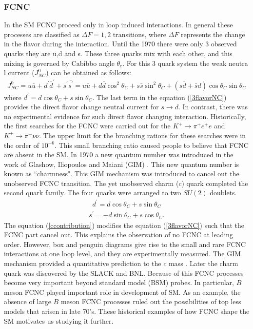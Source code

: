 \subsubsection{FCNC}
In the SM FCNC proceed only in loop induced interactions. In general these processes are classified as $\Delta F=1,2$ transitions, where $\Delta F$ represents the change in the flavor during the interaction. Until the 1970 there were only 3 observed quarks they are u,d and s. These three quarks mix with each other, and this mixing is governed by Cabibbo angle $\theta_c$. For this 3 quark system the weak neutra l current ($J_{N C}^{0}$) can be obtained as follows:
\begin{eqnarray}\label{3flavorNC}
J_{N C}^{0}=u \bar{u}+d^{\prime} \bar{d}^{\prime}+s^{\prime} \overline{s^{\prime}}=u \bar{u}+d \bar{d} \cos ^{2} \theta_{C}+s \bar{s} \sin ^{2} \theta_{C}+(s \bar{d}+\bar{s} d) \cos \theta_{C} \sin \theta_{C}
\end{eqnarray}    
where $d^{\prime}=d \cos \theta_{C}+s \sin \theta_{C}$. The last term in the equation (\ref{3flavorNC}) provides the direct flavor change neutral current for $s\rightarrow d$. In contrast, there was no experimental evidence for such direct flavor changing interaction. Historically, the first searches for the FCNC were carried out for the $K^+\rightarrow \pi^+e^+e$ and $K^+\rightarrow \pi^+\nu\bar{\nu}$. The upper limit for the branching rations for these searches were in the order of $10^{-6}$. This small branching ratio caused people to believe that FCNC are absent in the SM. In 1970 a new quantum number was introduced in the work of Glashow, Iliopoulos and Maiani (GIM) \cite{Glashow:1970gm}. This new quantum number is known as ``charmness". This GIM mechanism was introduced to cancel out the unobserved FCNC transition. The yet unobserved charm ($c$) quark completed the second quark family. The four quarks were arranged to two $SU(2)$ doublets.
\begin{eqnarray}
d^{\prime}=d \cos \theta_{C}+s \sin \theta_{C}
\end{eqnarray} 
\begin{eqnarray}\label{ccontribution}
s^{\prime}=-d \sin \theta_{C}+s \cos \theta_{C}.
\end{eqnarray}
The equation (\ref{ccontribution}) modifies the equation (\ref{3flavorNC}) such that the FCNC part cancel out. This explains the observation of no FCNC at leading order. However, box and penguin diagrams give rise to the small and rare FCNC interactions at one loop level, and they are experimentally measured. The GIM mechanism provided a quantitative prediction to the $c$ mass \cite{Gaillard:1974hs}. Later the charm quark was discovered by the SLACK and BNL. Because of this FCNC processes become very important beyond standard model (BSM) probes. In particular, $B$ meson FCNC played important role in development of SM.   As an example, the absence of large $B$ meson FCNC processes ruled out the possibilities of top less models that arisen in late 70's. These historical examples of how FCNC shape the SM motivates us studying it further.

